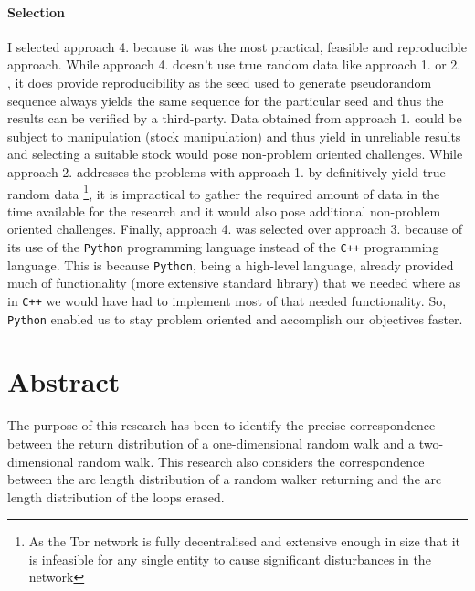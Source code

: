 \documentclass{article}
\begin{document}
\paragraph{Selection} I selected approach 4. because it was the most practical, feasible and reproducible approach. While approach 4. doesn't use true random data like approach 1. or 2. , it does provide reproducibility as the seed used to generate pseudorandom sequence always yields the same sequence for the particular seed and thus the results can be verified by a third-party. Data obtained from approach 1. could be subject to manipulation (stock manipulation) and thus yield in unreliable results and selecting a suitable stock would pose non-problem oriented challenges. While approach 2. addresses the problems with approach 1. by definitively yield true random data \footnote{As the Tor network is fully decentralised and extensive enough in size that it is infeasible for any single entity to cause significant disturbances in the network}, it is impractical to gather the required amount of data in the time available for the research and it would also pose additional non-problem oriented challenges. Finally, approach 4. was selected over approach 3. because of its use of the \texttt{Python} programming language instead of the \texttt{C++} programming language. This is because \texttt{Python}, being a high-level language, already provided much of functionality (more extensive standard library) that we needed where as in \texttt{C++} we would have had to implement most of that needed functionality. So, \texttt{Python} enabled us to stay problem oriented and accomplish our objectives faster.

 \section{Abstract}
The purpose of this research has been to identify the precise correspondence between the return distribution of a one-dimensional random walk and a two-dimensional random walk. This research also considers the correspondence between the arc length distribution of a random walker returning and the arc length distribution of the loops erased.
\end{document}
